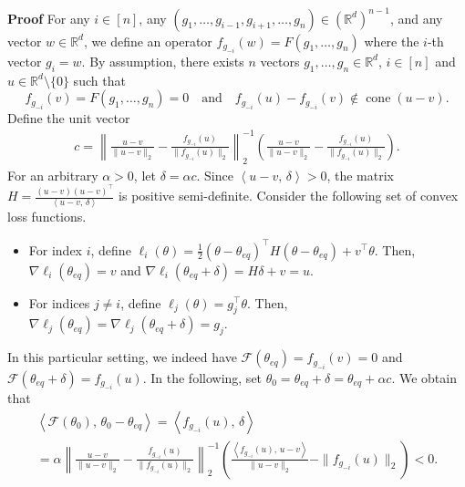 \documentclass[twoside,11pt]{article}
\newcommand{\R}{\mathbb{R}}
\newcommand{\F}{\mathcal{F}}
\providecommand{\iprod}[2]{\ensuremath{\left\langle #1,\,#2  \right\rangle}}
\begin{document}
\noindent\textbf{Proof}\;
    For any $i \in [n]$, any $(g_1,\ldots, g_{i-1}, g_{i+1}, \ldots, g_n) \in (\R^d)^{n-1}$, and any vector $w \in \R^d$, we define an operator $f_{g_{-i}}(w) = F\left( g_1, \ldots, g_n \right) $ where the $i$-th vector $g_i = w$. 
    By assumption, there exists $n$ vectors $g_1, \ldots, g_n \in \R^d$, $i \in [n]$ and $u \in \R^d \setminus \{0\}$ such that 
    \begin{equation*}
        f_{g_{-i}}(v) = F\left( g_1, \ldots, g_n \right) = 0
        \quad\text{and}\quad
        f_{g_{-i}}(u) - f_{g_{-i}}(v)  \not \in \operatorname{cone}(u-v).
    \end{equation*}
    Define the unit vector
    \begin{align*}
        c = \left\| \frac{u - v}{\| u - v \|_2} - \frac{f_{g_{-i}}(u) }{\| f_{g_{-i}}(u) \|_2} \right\|_2^{-1} \left( \frac{u - v}{ \| u - v \|_2} - \frac{f_{g_{-i}}(u) }{\| f_{g_{-i}}(u) \|_2}\right).
    \end{align*}
    For an arbitrary $\alpha > 0$, let $\delta = \alpha c$.
    Since $\iprod{u - v}{\delta} > 0$, the matrix $H = \frac{(u - v) (u - v)^\intercal}{\iprod{u - v}{\delta}}$ is positive semi-definite. 
    Consider the following set of convex loss functions.
    \begin{itemize}
        \item For index $i$, define $\ell_i(\theta) = \frac{1}{2} \left(\theta - \theta_{eq} \right)^\intercal H \left(\theta - \theta_{eq} \right) + v^\intercal \theta$. 
        Then, $\nabla \ell_i\left( \theta_{eq} \right) = v$ and $\nabla \ell_i \left( \theta_{eq} + \delta \right) = H \delta + v  = u$.
        \item For indices $j \neq i$, define $\ell_j(\theta) = g_j^\intercal \theta$. 
        Then, $\nabla \ell_j \left( \theta_{eq} \right) = \nabla \ell_j \left( \theta_{eq} + \delta \right) = g_j$.
    \end{itemize}
    In this particular setting, we indeed have $\F\left( \theta_{eq} \right) = f_{g_{-i}}(v) = 0$ and $\F\left( \theta_{eq} + \delta \right) = f_{g_{-i}}(u)$. 
    In the following, set $\theta_0 = \theta_{eq} + \delta = \theta_{eq} + \alpha c $. We obtain that
    \begin{multline}\label{eqn:non-monotone-1}
        \iprod{\F\left( \theta_0 \right) }{ \theta_0 - \theta_{eq}} 
        = \iprod{f_{g_{-i}}(u)}{\delta} \\
        = \alpha \left\| \frac{u - v}{\| u - v \|_2} - \frac{f_{g_{-i}}(u) }{\| f_{g_{-i}}(u) \|_2 } \right\|_2^{-1} \left( \frac{\iprod{f_{g_{-i}}(u)}{u - v}}{\| u - v \|_2} - \| f_{g_{-i}}(u) \|_2\right) < 0.
    \end{multline}
\end{document}
